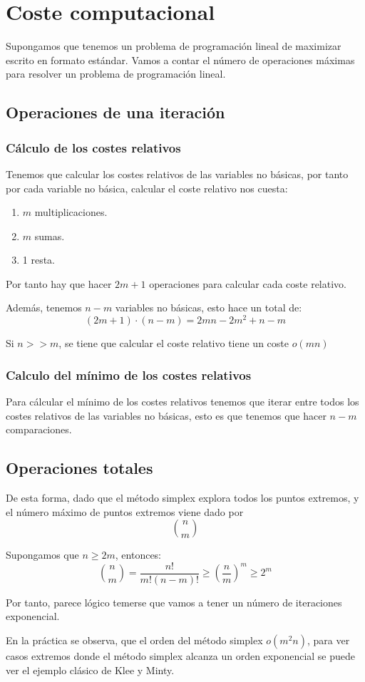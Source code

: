 \section{Coste computacional}

Supongamos que tenemos un problema de programación lineal de maximizar
escrito en formato estándar. Vamos a contar el número de operaciones
máximas para resolver un problema de programación lineal.

\subsection{Operaciones de una iteración}
\subsubsection{Cálculo de los costes relativos}
Tenemos que calcular los costes relativos de las variables no básicas,
por tanto por cada variable no básica, calcular el coste relativo nos
cuesta:

\begin{enumerate}
  \item $m$ multiplicaciones.
  \item $m$ sumas.
  \item 1 resta.
\end{enumerate}

Por tanto hay que hacer $2m+1$ operaciones para calcular cada coste
relativo.

Además, tenemos $n-m$ variables no básicas, esto hace un total de:
$$
(2m+1) \cdot (n-m) = 2mn - 2m^2+n-m
$$

Si $n >> m$, se tiene que calcular el coste relativo tiene un coste
$o(mn)$

\subsubsection{Calculo del mínimo de los costes relativos}
Para cálcular el mínimo de los costes relativos tenemos que iterar
entre todos los costes relativos de las variables no básicas, esto es
que tenemos que hacer $n-m$ comparaciones.

\subsection{Operaciones totales}
De esta forma, dado que el método simplex explora todos los puntos
extremos, y el número máximo de puntos extremos viene dado por
$$
{n\choose m}
$$

Supongamos que $n \geq 2m$, entonces:
$$
{n\choose m} = \frac{n!}{m!(n-m)!} \geq \left(\frac{n}{m}\right)^m \geq 2^m
$$

Por tanto, parece lógico temerse que vamos a tener un número de
iteraciones exponencial.

En la práctica se observa, que el orden del método simplex $o(m^2n)$,
para ver casos extremos donde el método simplex alcanza un orden
exponencial se puede ver el ejemplo clásico de Klee y Minty.
